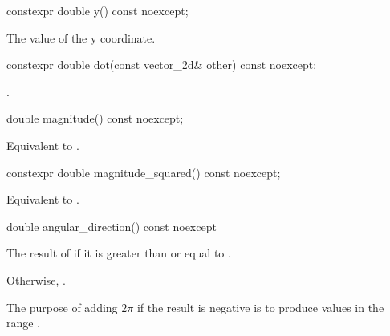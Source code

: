 \begin{itemdecl}
constexpr double y() const noexcept;
\end{itemdecl}
\begin{itemdescr}
\pnum
\returns
The value of the y coordinate.
\end{itemdescr}

\begin{itemdecl}
constexpr double dot(const vector_2d& other) const noexcept;
\end{itemdecl}
\begin{itemdescr}
\pnum
\returns
{}.
\end{itemdescr}

\begin{itemdecl}
    double magnitude() const noexcept;
\end{itemdecl}
\begin{itemdescr}
\pnum
\returns
Equivalent to .
\end{itemdescr}

\begin{itemdecl}
constexpr double magnitude_squared() const noexcept;
\end{itemdecl}
\begin{itemdescr}
\pnum
\returns
Equivalent to .
\end{itemdescr}

\begin{itemdecl}
double angular_direction() const noexcept
\end{itemdecl}
\begin{itemdescr}
\pnum
\returns
The result of  if it is greater than or equal to .

\pnum
Otherwise, . 

\pnum
\begin{note}
The purpose of adding $2\pi$ if the result is negative is to produce values in the range .
\end{note}
\end{itemdescr}

